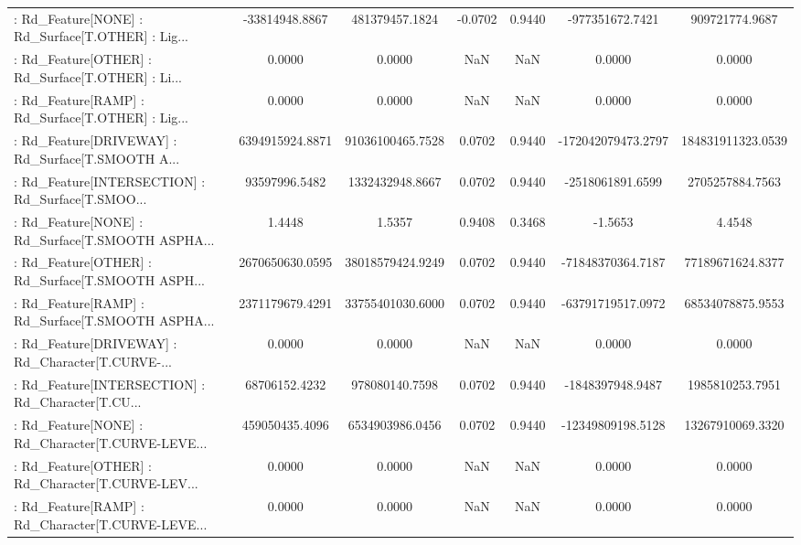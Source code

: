\begin{longtable}{p{4cm}cccccc}
 : Rd\_Feature[NONE] : Rd\_Surface[T.OTHER] : Lig... &    -33814948.8867 &    481379457.1824 & -0.0702 &       0.9440 &    -977351672.7421 &    909721774.9687 \\
 : Rd\_Feature[OTHER] : Rd\_Surface[T.OTHER] : Li... &            0.0000 &            0.0000 &     NaN &          NaN &             0.0000 &            0.0000 \\
 : Rd\_Feature[RAMP] : Rd\_Surface[T.OTHER] : Lig... &            0.0000 &            0.0000 &     NaN &          NaN &             0.0000 &            0.0000 \\
 : Rd\_Feature[DRIVEWAY] : Rd\_Surface[T.SMOOTH A... &   6394915924.8871 &  91036100465.7528 &  0.0702 &       0.9440 & -172042079473.2797 & 184831911323.0539 \\
 : Rd\_Feature[INTERSECTION] : Rd\_Surface[T.SMOO... &     93597996.5482 &   1332432948.8667 &  0.0702 &       0.9440 &   -2518061891.6599 &   2705257884.7563 \\
 : Rd\_Feature[NONE] : Rd\_Surface[T.SMOOTH ASPHA... &            1.4448 &            1.5357 &  0.9408 &       0.3468 &            -1.5653 &            4.4548 \\
 : Rd\_Feature[OTHER] : Rd\_Surface[T.SMOOTH ASPH... &   2670650630.0595 &  38018579424.9249 &  0.0702 &       0.9440 &  -71848370364.7187 &  77189671624.8377 \\
 : Rd\_Feature[RAMP] : Rd\_Surface[T.SMOOTH ASPHA... &   2371179679.4291 &  33755401030.6000 &  0.0702 &       0.9440 &  -63791719517.0972 &  68534078875.9553 \\
 : Rd\_Feature[DRIVEWAY] : Rd\_Character[T.CURVE-... &            0.0000 &            0.0000 &     NaN &          NaN &             0.0000 &            0.0000 \\
 : Rd\_Feature[INTERSECTION] : Rd\_Character[T.CU... &     68706152.4232 &    978080140.7598 &  0.0702 &       0.9440 &   -1848397948.9487 &   1985810253.7951 \\
 : Rd\_Feature[NONE] : Rd\_Character[T.CURVE-LEVE... &    459050435.4096 &   6534903986.0456 &  0.0702 &       0.9440 &  -12349809198.5128 &  13267910069.3320 \\
 : Rd\_Feature[OTHER] : Rd\_Character[T.CURVE-LEV... &            0.0000 &            0.0000 &     NaN &          NaN &             0.0000 &            0.0000 \\
 : Rd\_Feature[RAMP] : Rd\_Character[T.CURVE-LEVE... &            0.0000 &            0.0000 &     NaN &          NaN &             0.0000 &            0.0000 \\

\end{longtable}
